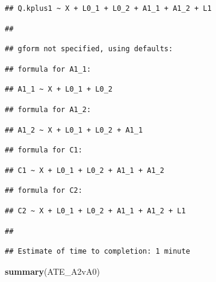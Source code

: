 \documentclass[
]{book}
\newenvironment{Shaded}{\begin{snugshade}}{\end{snugshade}}
\newcommand{\FunctionTok}[1]{\textcolor[rgb]{0.13,0.29,0.53}{\textbf{#1}}}
\newcommand{\NormalTok}[1]{#1}
\begin{document}
\begin{verbatim}
## Q.kplus1 ~ X + L0_1 + L0_2 + A1_1 + A1_2 + L1
\end{verbatim}

\begin{verbatim}
## 
\end{verbatim}

\begin{verbatim}
## gform not specified, using defaults:
\end{verbatim}

\begin{verbatim}
## formula for A1_1:
\end{verbatim}

\begin{verbatim}
## A1_1 ~ X + L0_1 + L0_2
\end{verbatim}

\begin{verbatim}
## formula for A1_2:
\end{verbatim}

\begin{verbatim}
## A1_2 ~ X + L0_1 + L0_2 + A1_1
\end{verbatim}

\begin{verbatim}
## formula for C1:
\end{verbatim}

\begin{verbatim}
## C1 ~ X + L0_1 + L0_2 + A1_1 + A1_2
\end{verbatim}

\begin{verbatim}
## formula for C2:
\end{verbatim}

\begin{verbatim}
## C2 ~ X + L0_1 + L0_2 + A1_1 + A1_2 + L1
\end{verbatim}

\begin{verbatim}
## 
\end{verbatim}

\begin{verbatim}
## Estimate of time to completion: 1 minute
\end{verbatim}

\begin{Shaded}
\begin{Highlighting}[]
\FunctionTok{summary}\NormalTok{(ATE\_A2vA0)}
\end{Highlighting}
\end{Shaded}
\end{document}
